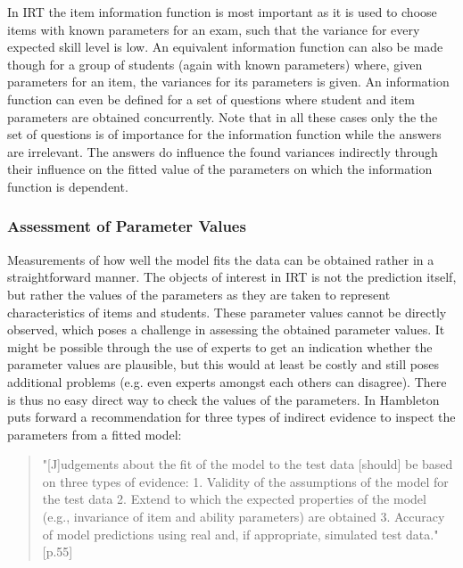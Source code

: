 \documentclass{scrartcl}
\begin{document}
In IRT the item information function is most important as it is used to choose items with known parameters for an exam, such that the variance for every expected skill level is low. An equivalent information function can also be made though for a group of students (again with known parameters) where, given parameters for an item, the variances for its parameters is given. An information function can even be defined for a set of questions where student and item parameters are obtained concurrently. Note that in all these cases only the the set of questions is of importance for the information function while the answers are irrelevant. The answers do influence the found variances indirectly through their influence on the fitted value of the parameters on which the information function is dependent.


\subsubsection{Assessment of Parameter Values}
\label{sec:asses}
Measurements of how well the model fits the data can be obtained rather in a straightforward manner. The objects of interest in IRT is not the prediction itself, but rather the values of the parameters as they are taken to represent characteristics of items and students. These parameter values cannot be directly observed, which poses a challenge in assessing the obtained parameter values. It might be possible through the use of experts to get an indication whether the parameter values are plausible, but this would at least be costly and still poses additional problems (e.g. even experts amongst each others can disagree). There is thus no easy direct way to check the values of the parameters. In \cite{hambleton} Hambleton puts forward a recommendation for three types of indirect evidence to inspect the parameters from a fitted model:

\begin{quote}"[J]udgements about the fit of the model to the test data [should] be based on three types of evidence: 1. Validity of the assumptions of the model for the test data 2. Extend to which the expected properties of the model (e.g., invariance of item and ability parameters) are obtained 3. Accuracy of model predictions using real and, if appropriate, simulated test data."[p.55]
\end{quote}
\end{document}
